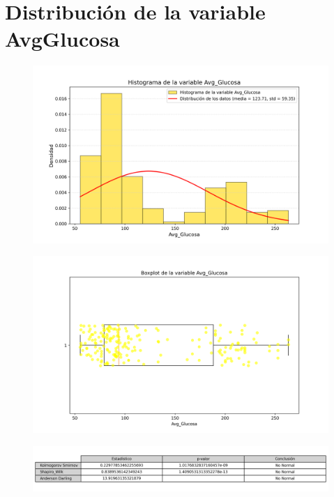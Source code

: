 \documentclass[a4paper, 12pt]{article}
\begin{document}
\section{Distribución de la variable AvgGlucosa}
\begin{figure}[H]
    \centering
    \includegraphics[width=1\textwidth]{img/Histogramas/Histograma_Avg_Glucosa.png}
\end{figure}

\begin{figure}[H]
    \centering
    \includegraphics[width=1\textwidth]{img/Boxplot/Boxplt_Avg_Glucosa.png}
\end{figure}

\begin{figure}[H]
    \centering
    \includegraphics[width=1\textwidth]{img/Tablas/test_normalidad_Avg_Glucosa.png}
\end{figure}
\end{document}
